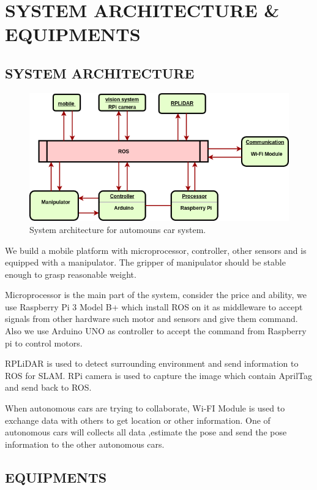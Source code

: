 \documentclass[a4paper, 10pt, conference]{ieeeconf}      %
\begin{document}
\section{SYSTEM ARCHITECTURE \& EQUIPMENTS}
\subsection{SYSTEM ARCHITECTURE}

\begin{figure}[h]
\includegraphics[width=0.95\columnwidth]{system_architecture}
\centering
\caption{System architecture for automouns car system.}
\end{figure}

We build a mobile platform with microprocessor, controller, other sensors and is equipped with a manipulator. The gripper of manipulator should be stable enough to grasp reasonable weight. 

Microprocessor is the main part of the system, consider the price and ability, we use Raspberry Pi 3 Model B+ which install ROS on it as middleware to accept signals from other hardware such motor and sensors and give them command. Also we use Arduino UNO as controller to accept the command from Raspberry pi to control motors.

RPLiDAR is used to detect surrounding environment and send information to ROS for SLAM. RPi camera is used to capture the image which contain AprilTag and send back to ROS.

When autonomous cars are trying to collaborate, Wi-FI Module is used to exchange data with others to get location or other information. One of  autonomous cars will collects all data ,estimate the pose and send the pose information to the other autonomous cars.



\subsection{EQUIPMENTS} 
\end{document}

